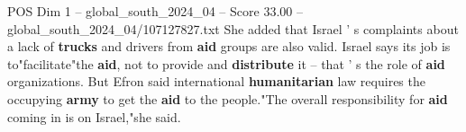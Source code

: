 \begin{textsample}{POS Dim 1 – global\_south\_2024\_04 – Score 33.00 – global\_south\_2024\_04/107127827.txt}
She added that Israel ' s complaints about a lack of \textbf{trucks} and drivers from \textbf{aid} groups are also valid.
Israel says its job is to"facilitate"the \textbf{aid}, not to provide and \textbf{distribute} it -- that ' s the role of \textbf{aid} organizations.
But Efron said international \textbf{humanitarian} law requires the occupying \textbf{army} to get the \textbf{aid} to the people."The overall responsibility for \textbf{aid} coming in is on Israel,"she said.

\end{textsample}
